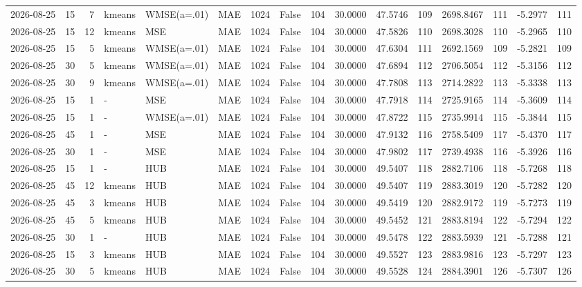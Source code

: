 \documentclass[10pt]{article}
\begin{document}
\begin{landscape}
\begin{longtable}{@{}lrrlllrcrrrrrrrr@{}}
2026-08-25 & 15 & 7 & kmeans & WMSE(a=.01) & MAE & 1024 & False & 104 & 30.0000 & 47.5746 & 109 & 2698.8467 & 111 & -5.2977 & 111 \\
2026-08-25 & 15 & 12 & kmeans & MSE & MAE & 1024 & False & 104 & 30.0000 & 47.5826 & 110 & 2698.3028 & 110 & -5.2965 & 110 \\
2026-08-25 & 15 & 5 & kmeans & WMSE(a=.01) & MAE & 1024 & False & 104 & 30.0000 & 47.6304 & 111 & 2692.1569 & 109 & -5.2821 & 109 \\
2026-08-25 & 30 & 5 & kmeans & WMSE(a=.01) & MAE & 1024 & False & 104 & 30.0000 & 47.6894 & 112 & 2706.5054 & 112 & -5.3156 & 112 \\
2026-08-25 & 30 & 9 & kmeans & WMSE(a=.01) & MAE & 1024 & False & 104 & 30.0000 & 47.7808 & 113 & 2714.2822 & 113 & -5.3338 & 113 \\
2026-08-25 & 15 & 1 & - & MSE & MAE & 1024 & False & 104 & 30.0000 & 47.7918 & 114 & 2725.9165 & 114 & -5.3609 & 114 \\
2026-08-25 & 15 & 1 & - & WMSE(a=.01) & MAE & 1024 & False & 104 & 30.0000 & 47.8722 & 115 & 2735.9914 & 115 & -5.3844 & 115 \\
2026-08-25 & 45 & 1 & - & MSE & MAE & 1024 & False & 104 & 30.0000 & 47.9132 & 116 & 2758.5409 & 117 & -5.4370 & 117 \\
2026-08-25 & 30 & 1 & - & MSE & MAE & 1024 & False & 104 & 30.0000 & 47.9802 & 117 & 2739.4938 & 116 & -5.3926 & 116 \\
2026-08-25 & 15 & 1 & - & HUB & MAE & 1024 & False & 104 & 30.0000 & 49.5407 & 118 & 2882.7106 & 118 & -5.7268 & 118 \\
2026-08-25 & 45 & 12 & kmeans & HUB & MAE & 1024 & False & 104 & 30.0000 & 49.5407 & 119 & 2883.3019 & 120 & -5.7282 & 120 \\
2026-08-25 & 45 & 3 & kmeans & HUB & MAE & 1024 & False & 104 & 30.0000 & 49.5419 & 120 & 2882.9172 & 119 & -5.7273 & 119 \\
2026-08-25 & 45 & 5 & kmeans & HUB & MAE & 1024 & False & 104 & 30.0000 & 49.5452 & 121 & 2883.8194 & 122 & -5.7294 & 122 \\
2026-08-25 & 30 & 1 & - & HUB & MAE & 1024 & False & 104 & 30.0000 & 49.5478 & 122 & 2883.5939 & 121 & -5.7288 & 121 \\
2026-08-25 & 15 & 3 & kmeans & HUB & MAE & 1024 & False & 104 & 30.0000 & 49.5527 & 123 & 2883.9816 & 123 & -5.7297 & 123 \\
2026-08-25 & 30 & 5 & kmeans & HUB & MAE & 1024 & False & 104 & 30.0000 & 49.5528 & 124 & 2884.3901 & 126 & -5.7307 & 126 \\

\end{longtable}
\end{landscape}
\end{document}
